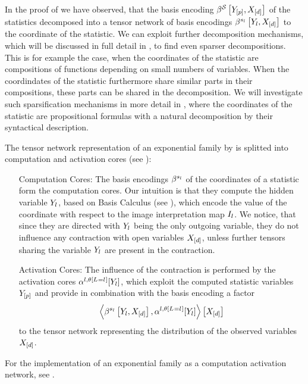 In the proof of  we have observed, that the basis encoding $\beta^{\mathcal{S}}\left[Y_{[p]},X_{[d]}\right]$ of the statistics decomposed into a tensor network of basis encodings $\beta^{s_{l}}\left[Y_{l},X_{[d]}\right]$ to the coordinate of the statistic.
We can exploit further decomposition mechanisms, which will be discussed in full detail in , to find even sparser decompositions.
This is for example the case, when the coordinates of the statistic are compositions of functions depending on small numbers of variables.
When the coordindates of the statistic furthermore share similar parts in their compositions, these parts can be shared in the decomposition.
We will investigate such sparsification mechanisms in more detail in , where the coordinates of the statistic are propositional formulas with a natural decomposition by their syntactical description.


The tensor network representation of an exponential family by  is splitted into computation and activation cores (see ):
\begin{itemize}
    \item[Computation Cores:] The basis encodings $\beta^{s_{l}}$ of the coordinates of a statistic form the computation cores.
    Our intuition is that they compute the hidden variable $Y_{l}$, based on Basis Calculus (see ), which encode the value of the coordinate with respect to the image interpretation map $I_{l}$.
    We notice, that since they are directed with $Y_{l}$ being the only outgoing variable, they do not influence any contraction with open variables $X_{[d]}$, unless further tensors sharing the variable $Y_{l}$ are present in the contraction.
    \item[Activation Cores:] The influence of the contraction is performed by the activation cores $\alpha^{l,\theta\left[L_{}=l_{}\right]}[Y_{l}]$, which exploit the computed statistic variables $Y_{[p]}$ and provide in combination with the basis encoding a factor
    \begin{align*}
        \left\langle \beta^{s_{l}}\left[Y_{l},X_{[d]}\right],\alpha^{l,\theta\left[L_{}=l_{}\right]}[Y_{l}]\right\rangle \left[ X_{[d]} \right]
    \end{align*}
    to the tensor network representing the distribution of the observed variables $X_{[d]}$.
\end{itemize}
For the implementation of an exponential family as a computation activation network, see . %

